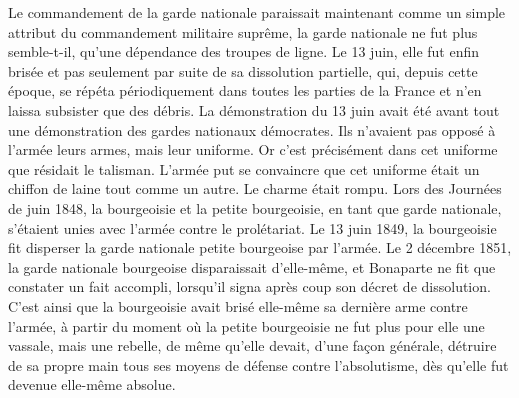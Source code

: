\documentclass[french,twoside]{book} %
\begin{document}
Le commandement de la garde nationale paraissait maintenant comme un simple attribut du commandement militaire suprême, la garde nationale ne fut plus semble-t-il, qu’une dépendance des troupes de ligne. Le 13 juin, elle fut enfin brisée et pas seulement par suite de sa dissolution partielle, qui, depuis cette époque, se répéta périodiquement dans toutes les parties de la France et n’en laissa subsister que des débris. La démonstration du 13 juin avait été avant tout une démonstration des gardes nationaux démocrates. Ils n’avaient pas opposé à l’armée leurs armes, mais leur uniforme. Or c’est précisément dans cet uniforme que résidait le talisman. L’armée put se convaincre que cet uniforme était un chiffon de laine tout comme un autre. Le charme était rompu. Lors des Journées de juin 1848, la bourgeoisie et la petite bourgeoisie, en tant que garde nationale, s’étaient unies avec l’armée contre le prolétariat. Le 13 juin 1849, la bourgeoisie fit disperser la garde nationale petite bourgeoise par l’armée. Le 2 décembre 1851, la garde nationale bourgeoise disparaissait d’elle-même, et Bonaparte ne fit que constater un fait accompli, lorsqu’il signa après coup son décret de dissolution. C’est ainsi que la bourgeoisie avait brisé elle-même sa dernière arme contre l’armée, à partir du moment où la petite bourgeoisie ne fut plus pour elle une vassale, mais une rebelle, de même qu’elle devait, d’une façon générale, détruire de sa propre main tous ses moyens de défense contre l’absolutisme, dès qu’elle fut devenue elle-même absolue.\par
\end{document}
